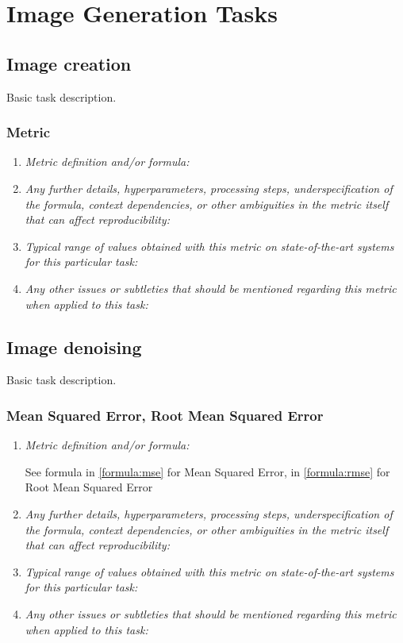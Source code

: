 \documentclass[a4paper,11pt]{article}
\begin{document}
\clearpage
\section{Image Generation Tasks}
    \subsection{Image creation} \label{image_creation}
        Basic task description.
        \subsubsection{Metric}
            \begin{enumerate}[label=\alph*.]
                \item \textit{Metric definition and/or formula:}
                \bigskip
                \item \textit{Any further details, hyperparameters, processing steps, underspecification of the formula, context dependencies, or other ambiguities in the metric itself that can affect reproducibility:}
                \bigskip
                \item \textit{Typical range of values obtained with this metric on state-of-the-art systems for this particular task:}
                \bigskip
                \item \textit{Any other issues or subtleties that should be mentioned regarding this metric when applied to this task:}
                \bigskip
            \end{enumerate}

    \subsection{Image denoising} \label{image_denoising}
        Basic task description.
        \subsubsection{Mean Squared Error, Root Mean Squared Error}
            \begin{enumerate}[label=\alph*.]
                \item \textit{Metric definition and/or formula:}

                See formula in \ref{formula:mse} for Mean Squared Error, in \ref{formula:rmse} for Root Mean Squared Error
                \bigskip
                \item \textit{Any further details, hyperparameters, processing steps, underspecification of the formula, context dependencies, or other ambiguities in the metric itself that can affect reproducibility:}
                \bigskip
                \item \textit{Typical range of values obtained with this metric on state-of-the-art systems for this particular task:}
                \bigskip
                \item \textit{Any other issues or subtleties that should be mentioned regarding this metric when applied to this task:}
                \bigskip
            \end{enumerate}
\end{document}
